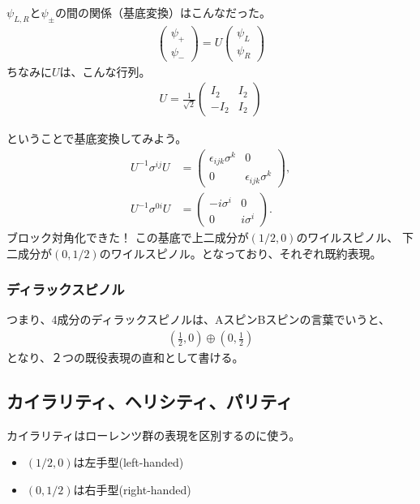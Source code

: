 \documentclass[10pt,a4paper]{jarticle}
\begin{document}
$\psi_{L,R}$と$\psi_\pm$の間の関係（基底変換）はこんなだった。
\begin{align}
\left(\begin{array}{c}
\psi_+ \\
\psi_-
\end{array}\right)
=
U
\left(\begin{array}{c}
\psi_L \\
\psi_R
\end{array}\right)
\end{align}
%
ちなみに$U$は、こんな行列。
\begin{align}
U = \frac{1}{\sqrt 2}\left(
\begin{array}{cc}
I_2 & I_2 \\
-I_2 & I_2
\end{array}
\right)
\end{align}

ということで基底変換してみよう。
\begin{align}
U^{-1} \sigma^{ij} U
&=
\left(
\begin{array}{cc}
\epsilon_{ijk} \sigma^k & 0 \\
0 & \epsilon_{ijk} \sigma^k
\end{array}
\right), \\
%
U^{-1} \sigma^{0i} U
&=
\left(
\begin{array}{cc}
-i\sigma^i & 0 \\
0 & i \sigma^i
\end{array}
\right).
\end{align}
ブロック対角化できた！
この基底で上二成分が$(1/2,0)$のワイルスピノル、
下二成分が$(0,1/2)$のワイルスピノル。となっており、それぞれ既約表現。


\subsubsection{ディラックスピノル}
つまり、4成分のディラックスピノルは、AスピンBスピンの言葉でいうと、
\begin{align}
\left( \frac{1}{2}, 0 \right) \oplus \left( 0, \frac{1}{2} \right)
\end{align}
となり、２つの既役表現の直和として書ける。

\subsection{カイラリティ、ヘリシティ、パリティ}

カイラリティはローレンツ群の表現を区別するのに使う。
\begin{itemize}
\item $(1/2,0)$は左手型(left-handed)
\item $(0,1/2)$は右手型(right-handed)
\end{itemize}
\end{document}
